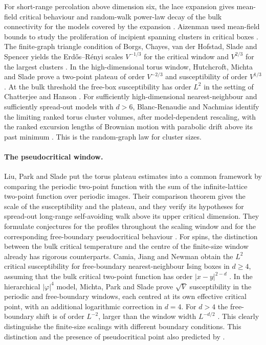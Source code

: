 \documentclass[11pt]{article}
\theoremstyle{definition}
\begin{document}
For short-range percolation above dimension six, the lace expansion
gives mean-field critical behaviour and random-walk power-law decay
of the bulk connectivity for the models covered by the expansion
\cite{HaraSladePercolation,HaraHofstadSlade2003}. Aizenman used
mean-field bounds to study the proliferation of incipient spanning
clusters in critical boxes \cite{AizenmanSpanning1997}. The finite-graph
triangle condition of Borgs, Chayes, van der Hofstad, Slade and Spencer
yields the Erd\H{o}s--R\'enyi scales $V^{-1/3}$ for
the critical window and $V^{2/3}$ for the largest clusters
\cite{BorgsEtAlI,BorgsEtAlII}. In the high-dimensional torus window,
Hutchcroft, Michta and Slade prove a two-point plateau of order
$V^{-2/3}$ and susceptibility of order $V^{1/3}$. At the bulk threshold
the free-box susceptibility has order $L^2$ in the setting of
Chatterjee and Hanson \cite{HutchcroftMichtaSlade2023,ChatterjeeHanson2020}.
For sufficiently high-dimensional nearest-neighbour and sufficiently
spread-out models with $d>6$, Blanc-Renaudie and Nachmias identify the
limiting ranked torus cluster volumes, after model-dependent
rescaling, with the ranked excursion lengths
of Brownian motion with parabolic drift above its past minimum
\cite{BlancRenaudieNachmias}. This is the random-graph law for cluster
sizes.

\paragraph{The pseudocritical window.}
Liu, Park and Slade put the torus plateau estimates into a common
framework by comparing the periodic two-point function with the sum of
the infinite-lattice two-point function over periodic images. Their
comparison theorem gives the scale of the susceptibility and the
plateau, and they verify its hypotheses for spread-out long-range
self-avoiding walk above its upper critical dimension. They formulate conjectures for the profiles throughout
the scaling window and for the corresponding free-boundary
pseudocritical behaviour \cite{LiuParkSlade2026}. For spins, the
distinction between the bulk critical temperature and the centre of the
finite-size window already has rigorous counterparts. Camia, Jiang
and Newman obtain the $L^2$ critical susceptibility for free-boundary
nearest-neighbour Ising boxes in \(d\ge4\), assuming that the bulk
critical two-point function has order \(\lvert x-y\rvert^{2-d}\)
\cite{CamiaJiangNewman2021}. In the hierarchical $|\varphi|^4$ model,
Michta, Park and Slade prove $\sqrt{V}$ susceptibility in the periodic and free-boundary windows, each centred at 
its own effective critical point, with an additional logarithmic correction in $d=4$.
For $d>4$ the free-boundary shift is of order $L^{-2}$, larger
than the window width $L^{-d/2}$ \cite{HierarchicalFBC}.
This clearly distinguishe the finite-size scalings with different boundary conditions.
This distinction and the presence of pseudocritical point also predicted by \cite{flores2016}.
\end{document}
